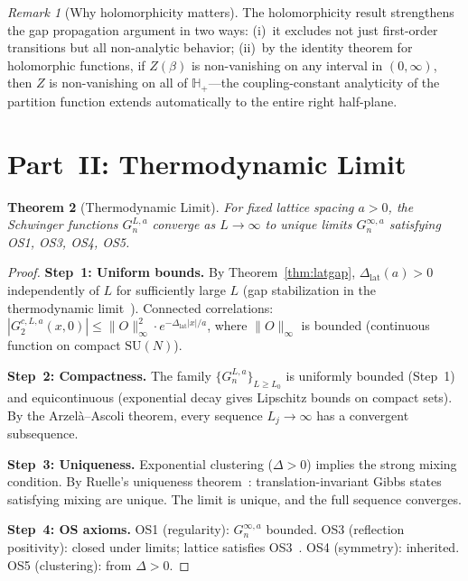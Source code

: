 \documentclass[12pt,a4paper]{article}
\theoremstyle{plain}
\newtheorem{theorem}{Theorem}[section]
\theoremstyle{definition}
\theoremstyle{remark}
\newtheorem{remark}[theorem]{Remark}
\begin{document}
\begin{remark}[Why holomorphicity matters]\label{rem:holomatter}
The holomorphicity result strengthens the gap propagation argument in two ways: (i)~it excludes not just first-order transitions but all non-analytic behavior; (ii)~by the identity theorem for holomorphic functions, if $Z(\beta)$ is non-vanishing on any interval in $(0,\infty)$, then $Z$ is non-vanishing on all of $\mathbb{H}_+$---the coupling-constant analyticity of the partition function extends automatically to the entire right half-plane.
\end{remark}
\section{Part~II: Thermodynamic Limit}\label{sec:thermo}

\begin{theorem}[Thermodynamic Limit]\label{thm:thermo}
For fixed lattice spacing $a>0$, the Schwinger functions $G_n^{L,a}$ converge as $L\to\infty$ to unique limits $G_n^{\infty,a}$ satisfying OS1, OS3, OS4, OS5.
\end{theorem}

\begin{proof}
\textbf{Step~1: Uniform bounds.} By Theorem~\ref{thm:latgap}, $\Delta_{\mathrm{lat}}(a)>0$ independently of $L$ for sufficiently large $L$ (gap stabilization in the thermodynamic limit~\cite{Ruelle1969}). Connected correlations:
$|G_2^{c,L,a}(x,0)| \leq \|O\|_\infty^2\cdot e^{-\Delta_{\mathrm{lat}}|x|/a}$,
where $\|O\|_\infty$ is bounded (continuous function on compact $\mathrm{SU}(N)$).

\textbf{Step~2: Compactness.} The family $\{G_n^{L,a}\}_{L\geq L_0}$ is uniformly bounded (Step~1) and equicontinuous (exponential decay gives Lipschitz bounds on compact sets). By the Arzel\`a--Ascoli theorem, every sequence $L_j\to\infty$ has a convergent subsequence.

\textbf{Step~3: Uniqueness.} Exponential clustering ($\Delta>0$) implies the strong mixing condition. By Ruelle's uniqueness theorem~\cite{Ruelle1969}: translation-invariant Gibbs states satisfying mixing are unique. The limit is unique, and the full sequence converges.

\textbf{Step~4: OS axioms.} OS1 (regularity): $G_n^{\infty,a}$ bounded. OS3 (reflection positivity): closed under limits; lattice satisfies OS3~\cite{OsterwalderSeiler1978}. OS4 (symmetry): inherited. OS5 (clustering): from $\Delta>0$.
\end{proof}
\end{document}
